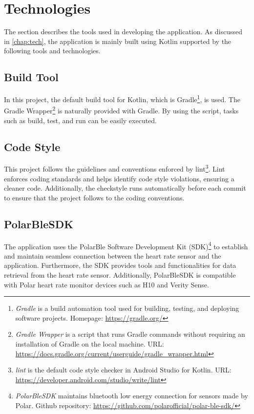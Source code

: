 \section{Technologies}
The section describes the tools used in developing the application. 
As discussed in \autoref{chap:tech}, the application is mainly built using Kotlin supported by the following tools and technologies.

\subsection{Build Tool}
In this project, the default build tool for Kotlin, which is Gradle\footnote{\emph{Gradle} is a build automation tool used for  building, testing, and deploying software projects. Homepage: \url{https://gradle.org/}}, is used.
The Gradle Wrapper\footnote{\emph{Gradle Wrapper} is a script that runs Gradle commands without requiring an installation of Gradle on the local machine. URL: \url{https://docs.gradle.org/current/userguide/gradle_wrapper.html}} is naturally provided with Gradle. 
By using the script, tasks such as build, test, and run can be easily executed.

\subsection{Code Style}
This project follows the guidelines and conventions enforced by lint\footnote{\emph{lint} is the default code style checker in Android Studio for Kotlin. URL: \url{https://developer.android.com/studio/write/lint}}.
Lint enforces coding standards and helps identify code style violations, ensuring a cleaner code. 
Additionally, the checkstyle runs automatically before each commit to ensure that the project follows to the coding conventions.

\subsection{PolarBleSDK}
\label{chap:polarblesdk}
The application uses the PolarBle Software Development Kit (SDK)\footnote{\emph{PolarBleSDK} maintains bluetooth low energy connection for sensors made by Polar. Github repository: \url{https://github.com/polarofficial/polar-ble-sdk/}} to establish and maintain seamless connection between the heart rate sensor and the application.
Furthermore, the SDK provides tools and functionalities for data retrieval from the heart rate sensor.
Additionally, PolarBleSDK is compatible with Polar heart rate monitor devices such as H10 and Verity Sense.

